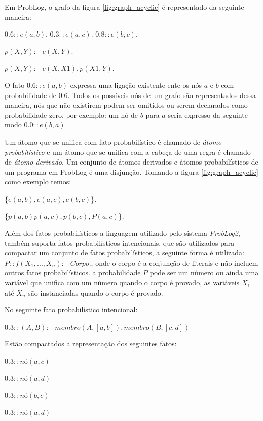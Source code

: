 \documentclass[
	12pt,				%
    oneside,			%
	a4paper,			%
	english,			%
	french,				%
	spanish,			%
	brazil,				%
	]{abntex2}
\begin{document}
Em ProbLog, o grafo da figura \ref{fig:graph_acyclic} é representado da seguinte maneira:

$0.6::e(a, b).  $ $0.3::e(a, c).  $ $0.8::e(b, c).$ \newline

$p(X, Y) :- e(X, Y). $ \newline

$p(X, Y) :- e(X, X1), p(X1, Y). $ \newline

O fato $0.6::e(a, b)$ expressa uma ligação existente ente os nós $a$ e $b$ com probabilidade de $0.6$. Todos os possíveis nós de um grafo são representados dessa maneira, nós que não existirem podem ser omitidos ou serem declarados como probabilidade zero, por exemplo: um nó de $b$ para $a$ seria expresso da seguinte modo $0.0::e(b, a)$.

Um átomo que se unifica com fato probabilístico é chamado de \textit{átomo probabilístico} e um átomo que se unifica com a cabeça de uma regra é chamado de \textit{átomo derivado}. Um conjunto de átomos derivados e átomos probabilísticos de um programa em ProbLog é uma disjunção. Tomando a figura \ref{fig:graph_acyclic} como exemplo temos:

\{$e(a, b), e(a, c), e(b, c)$\}.\newline

\{$p(a, b) p(a, c), p(b, c), P(a, c)$\}.\newline

Além dos fatos probabilísticos a linguagem utilizado pelo sistema \textit{ProbLog2}, também suporta fatos probabilísticos intencionais, que são utilizados para compactar um conjunto de fatos probabilísticos, a seguinte forma é utilizada: $P :: f(X_1,...,X_n):- Corpo.$, onde o corpo é a conjunção de literais e não incluem outros fatos probabilísticos. a probabilidade $P$ pode ser um número ou ainda uma variável que unifica com um número quando o corpo é provado, as variáveis $X_1$ até $X_n$ são instanciadas quando o corpo é provado.

No seguinte fato probabilístico intencional:

$0.3::(A, B) :- membro(A, [a, b]), membro(B, [c,d])$

Estão compactados a representação dos seguintes fatos:

$0.3::nó(a, c)$

$0.3::nó(a, d)$

$0.3::nó(b, c)$

$0.3::nó(a, d)$
\end{document}
